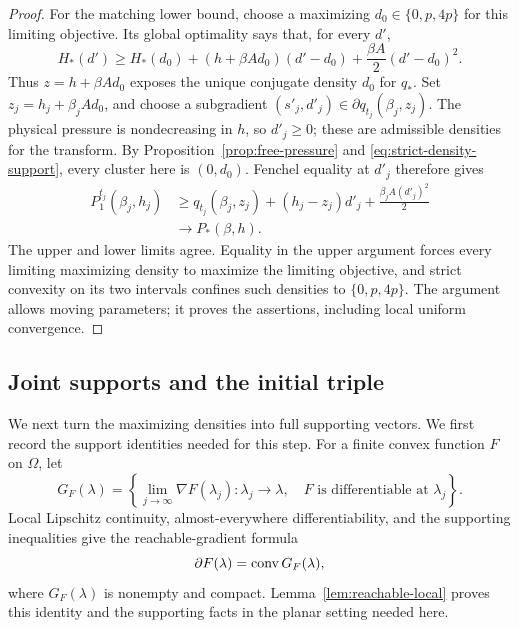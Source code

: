 \begin{proof}
For the matching lower bound, choose a maximizing
\(d_0\in\{0,p,4p\}\) for this limiting objective.
Its global optimality says that, for every \(d'\),
\begin{equation}\label{eq:strict-density-support}
 H_*(d')\ge H_*(d_0)
 +(h+\beta Ad_0)(d'-d_0)
 +\frac{\beta A}{2}(d'-d_0)^2.
\end{equation}
Thus \(z=h+\beta Ad_0\) exposes the unique conjugate density \(d_0\)
for \(q_*\).  Set \(z_j=h_j+\beta_jAd_0\), and choose a subgradient
\((s'_j,d'_j)\in\partial q_{t_j}(\beta_j,z_j)\).
The physical pressure is nondecreasing in \(h\), so \(d'_j\ge0\);
these are admissible densities for the transform.
By Proposition~\ref{prop:free-pressure} and
\eqref{eq:strict-density-support}, every cluster here is \((0,d_0)\).
Fenchel equality at \(d'_j\) therefore gives
\begin{align*}
 P_1^{t_j}(\beta_j,h_j)
 &\ge q_{t_j}(\beta_j,z_j)
       +(h_j-z_j)d'_j+\frac{\beta_jA(d'_j)^2}{2}\\
 &\longrightarrow P_*(\beta,h).
\end{align*}
The upper and lower limits agree.  Equality in the upper argument
forces every limiting maximizing density to maximize the limiting
objective, and strict convexity on its two intervals confines such
densities to \(\{0,p,4p\}\).  The argument allows moving parameters;
it proves the assertions, including local uniform convergence.
\end{proof}

\subsection{Joint supports and the initial triple}

We next turn the maximizing densities into full supporting vectors.
We first record the support identities needed for this step.  For a finite convex function \(F\) on \(\Omega\), let
\[
 G_F(\lambda)=
 \left\{\lim_{j\to\infty}\nabla F(\lambda_j):
 \lambda_j\to\lambda,\quad F\text{ is differentiable at }\lambda_j\right\}.
\]
Local Lipschitz continuity, almost-everywhere differentiability, and the
supporting inequalities give the reachable-gradient formula
\cite[Theorem~9.61]{RockafellarWets1998}
\begin{equation}\label{eq:reachable-gradient-formula}
 \partial F(\lambda)=\operatorname{conv} G_F(\lambda),
\end{equation}
where \(G_F(\lambda)\) is nonempty and compact.  Lemma~\ref{lem:reachable-local} proves this identity and the supporting
facts in the planar setting needed here.


